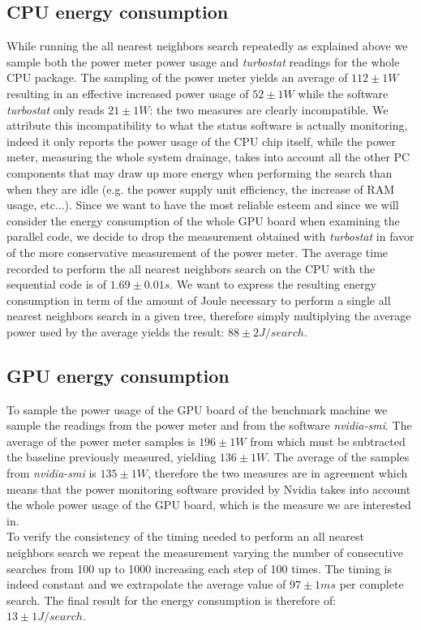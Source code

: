 \subsection{CPU energy consumption}
While running the all nearest neighbors search repeatedly as explained above we sample both the power meter power usage and \textit{turbostat} readings for the whole CPU package. The sampling of the power meter yields an average of $112 \pm 1 \unit{W}$ resulting in an effective increased power usage of $52 \pm 1 \unit{W}$ while the software \textit{turbostat} only reads $21 \pm 1 \unit{W}$: the two measures are clearly incompatible. We attribute this incompatibility to what the status software is actually monitoring, indeed it only reports the power usage of the CPU chip itself, while the power meter, measuring the whole system drainage, takes into account all the other PC components that may draw up more energy when performing the search than when they are idle (e.g. the power supply unit efficiency, the increase of RAM usage, etc...). Since we want to have the most reliable esteem and since we will consider the energy consumption of the whole GPU board when examining the parallel code, we decide to drop the measurement obtained with \textit{turbostat} in favor of the more conservative measurement of the power meter. The average time recorded to perform the all nearest neighbors search on the CPU with the sequential code is of $1.69 \pm 0.01 \unit{s}$. We want to express the resulting energy consumption in term of the amount of Joule necessary to perform a single all nearest neighbors search in a given tree, therefore simply multiplying the average power used by the average yields the result: $88 \pm 2 \unit{J/search}$.

\subsection{GPU energy consumption}
To sample the power usage of the GPU board of the benchmark machine we sample the readings from the power meter and from the software \textit{nvidia-smi}. The average of the power meter samples is $196 \pm 1 \unit{W}$ from which must be subtracted the baseline previously measured, yielding $136 \pm 1 \unit{W}$. The average of the samples from \textit{nvidia-smi} is $135 \pm 1 \unit{W}$, therefore the two measures are in agreement which means that the power monitoring software provided by Nvidia takes into account the whole power usage of the GPU board, which is the measure we are interested in.\\
To verify the consistency of the timing needed to perform an all nearest neighbors search we repeat the measurement varying the number of consecutive searches from 100 up to 1000 increasing each step of 100 times. The timing is indeed constant and we extrapolate the average value of $97 \pm 1 \unit{ms}$ per complete search. The final result for the energy consumption is therefore of: $13 \pm 1 \unit{J/search}$.

